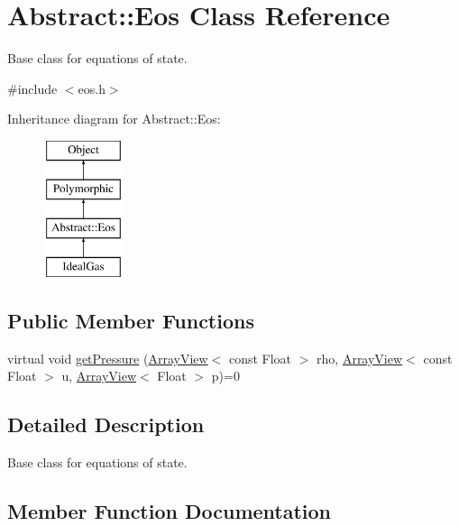 \hypertarget{classAbstract_1_1Eos}{}\section{Abstract\+:\+:Eos Class Reference}
\label{classAbstract_1_1Eos}


Base class for equations of state.  




{\ttfamily \#include $<$eos.\+h$>$}

Inheritance diagram for Abstract\+:\+:Eos\+:\begin{figure}[H]
\begin{center}
\leavevmode
\includegraphics[height=4.000000cm]{classAbstract_1_1Eos}
\end{center}
\end{figure}
\subsection*{Public Member Functions}
\begin{DoxyCompactItemize}
\item 
virtual void \hyperlink{classAbstract_1_1Eos_ab21906f5fc78370a10cdbf97983544ea}{get\+Pressure} (\hyperlink{classArrayView}{Array\+View}$<$ const Float $>$ rho, \hyperlink{classArrayView}{Array\+View}$<$ const Float $>$ u, \hyperlink{classArrayView}{Array\+View}$<$ Float $>$ p)=0
\end{DoxyCompactItemize}


\subsection{Detailed Description}
Base class for equations of state. 

\subsection{Member Function Documentation}
\hypertarget{classAbstract_1_1Eos_ab21906f5fc78370a10cdbf97983544ea}{}\label{classAbstract_1_1Eos_ab21906f5fc78370a10cdbf97983544ea} 
